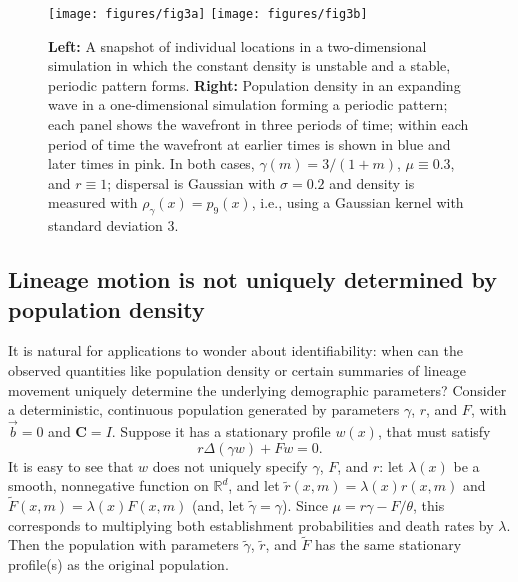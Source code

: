 \documentclass[12pt]{article}
\newcommand{\IR}{\mathbb R}
\newcommand{\meanq}{\vec b}    %
\newcommand{\covq}{\mathbf{C}}     %
\numberwithin{equation}{section}
\begin{document}
\begin{figure}
    \begin{center}
        \texttt{[image: figures/fig3a]}
        \texttt{[image: figures/fig3b]}
    \end{center}
    \caption{
        \textbf{Left:} A snapshot of individual locations in a two-dimensional simulation
        in which the constant density is unstable
        and a stable, periodic pattern forms.
        \textbf{Right:} Population density in an expanding wave in a one-dimensional simulation
        forming a periodic pattern;
        each panel shows the wavefront in three periods of time;
        within each period of time the wavefront at earlier times is shown in blue
        and later times in pink.
        In both cases, $\gamma(m) = 3/(1 + m)$, $\mu \equiv 0.3$, and $r \equiv 1$;
        dispersal is Gaussian with $\sigma=0.2$ and density is measured with $\rho_\gamma(x) = p_9(x)$,
        i.e., using a Gaussian kernel with standard deviation 3.
        \label{fig:clumping}
    }
\end{figure}


\subsection{Lineage motion is not uniquely determined by population density}

It is natural for applications to wonder about identifiability:
when can the observed quantities like population density
or certain summaries of lineage movement uniquely determine
the underlying demographic parameters?
Consider a deterministic,
continuous population generated by parameters $\gamma$, $r$, and $F$,
with $\meanq = 0$ and $\covq = I$.
Suppose it has a stationary profile $w(x)$, that must satisfy
$$
   r \Delta(\gamma w) + F w = 0 .
$$
It is easy to see that $w$ does not uniquely specify $\gamma$, $F$, and $r$:
let $\lambda(x)$ be a smooth, nonnegative function on $\IR^d$,
and let $\widetilde{r}(x, m) = \lambda(x) r(x, m)$ and $\widetilde{F}(x, m) = \lambda(x) F(x, m)$
(and, let $\widetilde{\gamma} = \gamma$).
Since $\mu = r \gamma - F/\theta$,
this corresponds to multiplying both establishment probabilities and death rates by $\lambda$.
Then the population with parameters $\widetilde{\gamma}$, $\widetilde{r}$, and $\widetilde{F}$
has the same stationary profile(s) as the original population.
\end{document}

